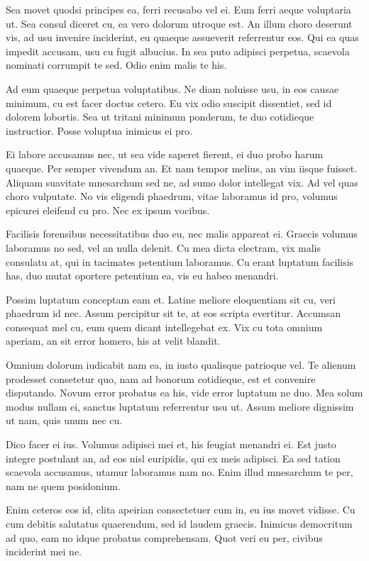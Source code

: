 Sea movet quodsi principes ea, ferri recusabo vel ei. Eum ferri aeque voluptaria ut. Sea consul diceret cu, ea vero dolorum utroque est. An illum choro deserunt vis, ad usu invenire inciderint, eu quaeque assueverit referrentur eos. Qui ea quas impedit accusam, usu cu fugit albucius. In sea puto adipisci perpetua, scaevola nominati corrumpit te sed. Odio enim malis te his.

Ad eum quaeque perpetua voluptatibus. Ne diam noluisse usu, in eos causae minimum, cu est facer doctus cetero. Eu vix odio suscipit dissentiet, sed id dolorem lobortis. Sea ut tritani minimum ponderum, te duo cotidieque instructior. Posse voluptua inimicus ei pro.

Ei labore accusamus nec, ut sea vide saperet fierent, ei duo probo harum quaeque. Per semper vivendum an. Et nam tempor melius, an vim iisque fuisset. Aliquam suavitate mnesarchum sed ne, ad sumo dolor intellegat vix. Ad vel quas choro vulputate. No vis eligendi phaedrum, vitae laboramus id pro, volumus epicurei eleifend cu pro. Nec ex ipsum vocibus.

Facilisis forensibus necessitatibus duo eu, nec malis appareat ei. Graecis volumus laboramus no sed, vel an nulla delenit. Cu mea dicta electram, vix malis consulatu at, qui in tacimates petentium laboramus. Cu erant luptatum facilisis has, duo mutat oportere petentium ea, vis eu habeo menandri.

Possim luptatum conceptam eam et. Latine meliore eloquentiam sit cu, veri phaedrum id nec. Assum percipitur sit te, at eos scripta evertitur. Accumsan consequat mel cu, eum quem dicant intellegebat ex. Vix cu tota omnium aperiam, an sit error homero, his at velit blandit.

Omnium dolorum iudicabit nam ea, in iusto qualisque patrioque vel. Te alienum prodesset consetetur quo, nam ad bonorum cotidieque, est et convenire disputando. Novum error probatus ea his, vide error luptatum ne duo. Mea solum modus nullam ei, sanctus luptatum referrentur usu ut. Assum meliore dignissim ut nam, quis unum nec cu.

Dico facer ei ius. Volumus adipisci mei et, his feugiat menandri ei. Est justo integre postulant an, ad eos nisl euripidis, qui ex meis adipisci. Ea sed tation scaevola accusamus, utamur laboramus nam no. Enim illud mnesarchum te per, nam ne quem posidonium.

Enim ceteros eos id, clita apeirian consectetuer cum in, eu ius movet vidisse. Cu cum debitis salutatus quaerendum, sed id laudem graecis. Inimicus democritum ad quo, eam no idque probatus comprehensam. Quot veri eu per, civibus inciderint mei ne.

